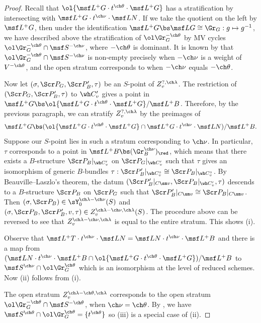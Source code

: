\documentclass[final]{amsart}
\theoremstyle{remark}
\theoremstyle{definition}
\numberwithin{equation}{section}
\begin{document}
\begin{proof}
Recall that $\ol{\msf L^+G\cdot t^{\ch\theta}\cdot \msf L^+G}$ has a stratification 
by intersecting with $\msf L^+G\cdot t^{\ch\nu}\cdot \msf L N$. 
If we take the quotient on the left by $\msf L^+ G$, then 
under the identification 
$\msf L^+G \bs \msf L G \cong \Gr_G : g \mapsto g^{-1}$, we have
described above the stratification of $\ol\Gr^{-\ch\theta}_G$ 
by MV cycles $\ol\Gr^{-\ch\theta}_G \cap \msf S^{-\ch\nu}$, where
$-\ch\theta$ is dominant. 
It is known by \cite[Theorem 3.2]{MV} that 
$\ol\Gr^{-\ch\theta}_G \cap \msf S^{-\ch\nu}$
is non-empty precisely when $-\ch\nu$ is a weight of 
$V^{-\ch\theta}$, and the open stratum corresponds to 
when $-\ch\nu$ equals $-\ch\theta$.

Now let $(\sigma,\Scr P_G, \Scr P'_B,\tau)$ be an $S$-point of 
$Z_v^{?,\ch\lambda}$. The restriction of $(\Scr P_G,\Scr P'_B,\tau)$
to $\wh C'_v$ gives a point in $\msf L^+G \bs \ol{\msf L^+G \cdot t^{\ch\theta} \cdot \msf L^+ G} / \msf L^+ B$. 
Therefore, by the previous paragraph, we can stratify $Z_v^{?,\ch\lambda}$
by the preimages of 
\[  \msf L^+G \bs (\ol{\msf L^+G\cdot t^{\ch\theta}\cdot \msf L^+G} \cap \msf L^+G\cdot t^{\ch\nu}\cdot \msf L N) / \msf L^+B . \] 
Suppose our $S$-point lies in such a stratum corresponding to $\ch\nu$. 
In particular, $\tau$ 
corresponds to a point in $\msf L^+B \bs (\Gr^{\ch\nu}_B)_\red$,
which means that there exists a $B$-structure $\Scr P_B|_{\wh C'_v}$
on $\Scr P_G|_{\wh C'_v}$ such that $\tau$ gives an isomorphism
of generic $B$-bundles
$\tau : \Scr P'_B|_{\wh C^\circ_v} \cong \Scr P_B|_{\wh C^\circ_v}$.  
By Beauville--Laszlo's theorem, the datum $(\Scr P'_B|_{C\sm v}, \Scr P_B|_{\wh C'_v},\tau)$ descends to a $B$-structure $\Scr P_B$ on $\Scr P_G$
such that 
$\Scr P'_B|_{C\sm v} \cong \Scr P_B|_{C\sm v}$. 
Then $(\sigma, \Scr P_B) \in \sY_0^{\ch\lambda-\ch\nu}(S)$ and 
$(\sigma,\Scr P_B, \Scr P'_B, v, \tau) \in Z_v^{\ch\lambda-\ch\nu,\ch\lambda}(S)$. 
The procedure above can be reversed to see that $Z_v^{\ch\lambda-\ch\nu,\ch\lambda}$ is equal to the entire stratum.
This shows (i). 

\smallskip

Observe that $\msf L^+ T \cdot t^{\ch\nu} \cdot \msf L N = \msf L N \cdot t^{\ch\nu} \cdot \msf L^+B$ and 
there is a map from 
$(\msf L N \cdot t^{\ch\nu} \cdot \msf L^+B \cap \ol{\msf L^+G \cdot t^{\ch\theta} \cdot \msf L^+G})/\msf L^+B$ to $\msf S^{\ch\nu}\cap \ol\Gr^{\ch\theta}_G$ which is an isomorphism at the level of reduced schemes. 
Now (ii) follows from (i).

The open stratum $Z_v^{\ch\lambda-\ch\theta,\ch\lambda}$ 
corresponds to the open stratum $\ol\Gr^{-\ch\theta}_G \cap \msf S^{-\ch\theta}$, 
when $\ch\nu=\ch\theta$. 
By \cite[(3.6)]{MV}, we have $\msf S^{\ch\theta} \cap \ol\Gr^{\ch\theta}_G = \{t^{\ch\theta}\}$
so (iii) is a special case of (ii).
\end{proof}
\end{document}
